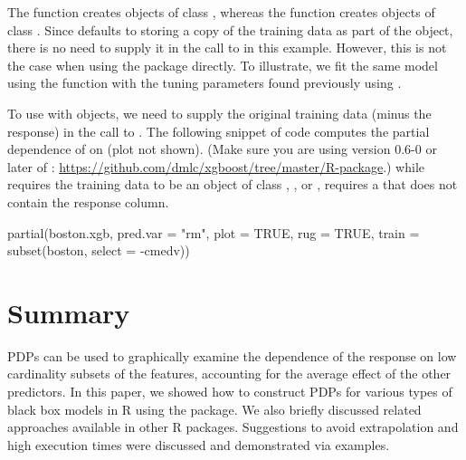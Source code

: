 The  function creates objects of class , whereas the  function creates objects of class . Since  defaults to storing a copy of the training data as part of the  object, there is no need to supply it in the call to  in this example. However, this is not the case when using the  package directly. To illustrate, we fit the same model using the  function with the tuning parameters found previously using .
To use  with  objects, we need to supply the original training data (minus the response) in the call to . The following snippet of code computes the partial dependence of  on  (plot not shown). (Make sure you are using version 0.6-0 or later of : \url{https://github.com/dmlc/xgboost/tree/master/R-package}.)  while  requires the training data to be an object of class , , or ,  requires a  that does not contain the response column.
\begin{example}
partial(boston.xgb, pred.var = "rm", plot = TRUE, rug = TRUE,
        train = subset(boston, select = -cmedv))
\end{example}


\section{Summary}

PDPs can be used to graphically examine the dependence of the response on low cardinality subsets of the features, accounting for the average effect of the other predictors. In this paper, we showed how to construct PDPs for various types of black box models in R using the  package. We also briefly discussed related approaches available in other R packages. Suggestions to avoid extrapolation and high execution times were discussed and demonstrated via examples.

